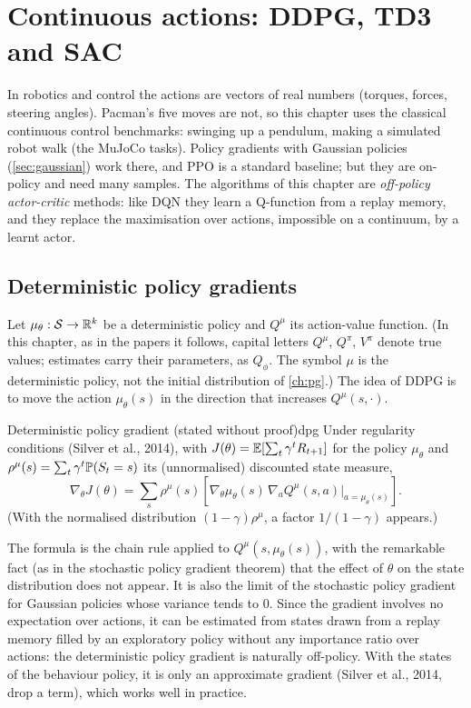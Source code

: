 \chapter{Continuous actions: DDPG, TD3 and SAC}
\label{ch:continuous}

In robotics and control the actions are vectors of real numbers (torques,
forces, steering angles). Pacman's five moves are not, so this chapter uses
the classical continuous control benchmarks: swinging up a pendulum,
making a simulated robot walk (the MuJoCo tasks). Policy gradients with
Gaussian policies (\cref{sec:gaussian}) work there, and PPO is a standard
baseline; but they are on-policy and need many samples. The algorithms of
this chapter are \emph{off-policy actor-critic} methods: like DQN they learn
a Q-function from a replay memory, and they replace the maximisation over
actions, impossible on a continuum, by a learnt actor.

\section{Deterministic policy gradients}

Let $\mu_\theta : \mathcal{S} \to \mathbb{R}^k$ be a deterministic policy and $Q^\mu$ its
action-value function. (In this chapter, as in the papers it follows,
capital letters $Q^\mu$, $Q^\pi$, $V^\pi$ denote true values; estimates carry
their parameters, as $Q_\phi$. The symbol $\mu$ is the deterministic
policy, not the initial distribution of \cref{ch:pg}.) The idea of DDPG is to
move the action $\mu_\theta(s)$ in the direction that increases $Q^\mu(s,
\cdot)$.

\begin{theorem}{Deterministic policy gradient (stated without proof)}{dpg}
  Under regularity conditions (Silver et al., 2014), with $J(\theta) =
  \mathbb{E}[\sum_t \gamma^t R_{t+1}]$ for the policy $\mu_\theta$ and
  $\rho^\mu(s) = \sum_t \gamma^t \mathbb{P}(S_t = s)$ its (unnormalised)
  discounted state measure,
  \begin{equation}
    \label{eq:dpg}
    \nabla_\theta J(\theta) = \sum_s \rho^\mu(s) \left[ \nabla_\theta
    \mu_\theta(s)\, \nabla_a Q^\mu(s, a) \big|_{a = \mu_\theta(s)}
    \right].
  \end{equation}
  (With the normalised distribution $(1 - \gamma) \rho^\mu$, a factor
  $1 / (1 - \gamma)$ appears.)
\end{theorem}

The formula is the chain rule applied to $Q^\mu(s, \mu_\theta(s))$, with the
remarkable fact (as in the stochastic policy gradient theorem) that the
effect of $\theta$ on the state distribution does not appear. It is also
the limit of the stochastic policy gradient for Gaussian policies whose
variance tends to $0$. Since the gradient involves no expectation over
actions, it can be estimated from states drawn from a replay memory filled
by an exploratory policy without any importance ratio over actions: the
deterministic policy gradient is naturally off-policy. With the states of
the behaviour policy, it is only an approximate gradient (Silver et al.,
2014, drop a term), which works well in practice.

